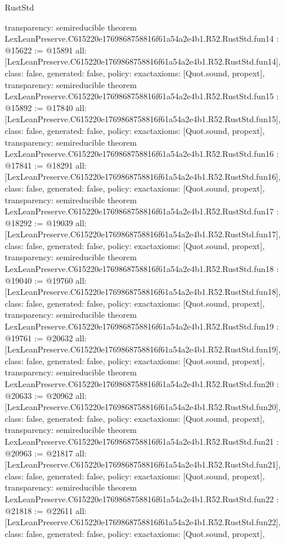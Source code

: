 \begin{lexlean}{RustStd}
\begin{coremodule}
{  transparency: semireducible
}
theorem LexLeanPreserve.C615220e1769868758816f61a54a2e4b1.R52.RustStd.fun14 : @15622 := @15891 {
  all: [LexLeanPreserve.C615220e1769868758816f61a54a2e4b1.R52.RustStd.fun14],
  class: false,
  generated: false,
  policy: exact{axioms: [Quot.sound, propext]},
  transparency: semireducible
}
theorem LexLeanPreserve.C615220e1769868758816f61a54a2e4b1.R52.RustStd.fun15 : @15892 := @17840 {
  all: [LexLeanPreserve.C615220e1769868758816f61a54a2e4b1.R52.RustStd.fun15],
  class: false,
  generated: false,
  policy: exact{axioms: [Quot.sound, propext]},
  transparency: semireducible
}
theorem LexLeanPreserve.C615220e1769868758816f61a54a2e4b1.R52.RustStd.fun16 : @17841 := @18291 {
  all: [LexLeanPreserve.C615220e1769868758816f61a54a2e4b1.R52.RustStd.fun16],
  class: false,
  generated: false,
  policy: exact{axioms: [Quot.sound, propext]},
  transparency: semireducible
}
theorem LexLeanPreserve.C615220e1769868758816f61a54a2e4b1.R52.RustStd.fun17 : @18292 := @19039 {
  all: [LexLeanPreserve.C615220e1769868758816f61a54a2e4b1.R52.RustStd.fun17],
  class: false,
  generated: false,
  policy: exact{axioms: [Quot.sound, propext]},
  transparency: semireducible
}
theorem LexLeanPreserve.C615220e1769868758816f61a54a2e4b1.R52.RustStd.fun18 : @19040 := @19760 {
  all: [LexLeanPreserve.C615220e1769868758816f61a54a2e4b1.R52.RustStd.fun18],
  class: false,
  generated: false,
  policy: exact{axioms: [Quot.sound, propext]},
  transparency: semireducible
}
theorem LexLeanPreserve.C615220e1769868758816f61a54a2e4b1.R52.RustStd.fun19 : @19761 := @20632 {
  all: [LexLeanPreserve.C615220e1769868758816f61a54a2e4b1.R52.RustStd.fun19],
  class: false,
  generated: false,
  policy: exact{axioms: [Quot.sound, propext]},
  transparency: semireducible
}
theorem LexLeanPreserve.C615220e1769868758816f61a54a2e4b1.R52.RustStd.fun20 : @20633 := @20962 {
  all: [LexLeanPreserve.C615220e1769868758816f61a54a2e4b1.R52.RustStd.fun20],
  class: false,
  generated: false,
  policy: exact{axioms: [Quot.sound, propext]},
  transparency: semireducible
}
theorem LexLeanPreserve.C615220e1769868758816f61a54a2e4b1.R52.RustStd.fun21 : @20963 := @21817 {
  all: [LexLeanPreserve.C615220e1769868758816f61a54a2e4b1.R52.RustStd.fun21],
  class: false,
  generated: false,
  policy: exact{axioms: [Quot.sound, propext]},
  transparency: semireducible
}
theorem LexLeanPreserve.C615220e1769868758816f61a54a2e4b1.R52.RustStd.fun22 : @21818 := @22611 {
  all: [LexLeanPreserve.C615220e1769868758816f61a54a2e4b1.R52.RustStd.fun22],
  class: false,
  generated: false,
  policy: exact{axioms: [Quot.sound, propext]},
}
\end{coremodule}
\end{lexlean}
